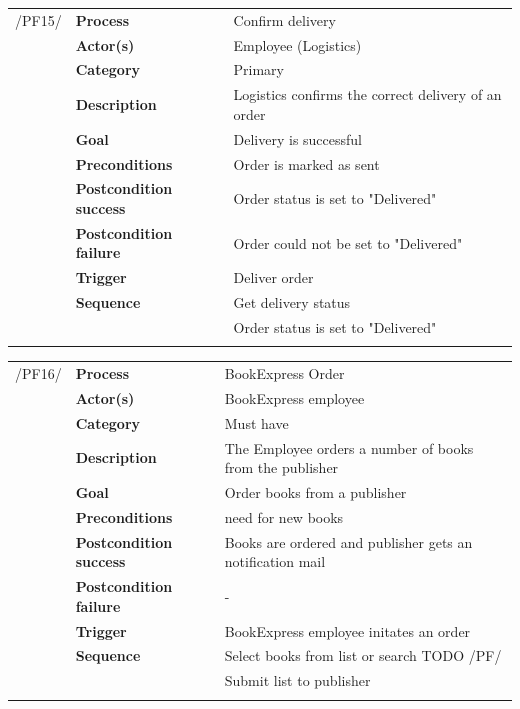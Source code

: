 \documentclass[11pt,a4paper,oneside,svgnames]{report}
\begin{document}
\noindent
\begin{tabular}{p{1.5cm}p{3cm}p{8cm}}
\cellcolor{white}/PF15/	& \textbf{Process} & Confirm delivery\\
\cellcolor{white}		& \textbf{Actor(s)} & Employee (Logistics)\\
\cellcolor{white}		& \textbf{Category} & Primary\\
\cellcolor{white}		& \textbf{Description}	 & Logistics confirms the correct delivery of an order\\
\cellcolor{white}		& \textbf{Goal} & Delivery is successful\\
\cellcolor{white}		& \textbf{Preconditions} & Order is marked as sent\\
\cellcolor{white}		& \textbf{Postcondition success} & Order status is set to "Delivered"\\
\cellcolor{white}		& \textbf{Postcondition failure} & Order could not be set to "Delivered"\\
\cellcolor{white}		& \textbf{Trigger} & Deliver order\\
\cellcolor{white}		& \textbf{Sequence} & Get delivery status\\
\cellcolor{white}		& & Order status is set to "Delivered"\\
\cellcolor{white}\hfill \\
\end{tabular}

\noindent
\begin{tabular}{p{1.5cm}p{3cm}p{8cm}}
\cellcolor{white}/PF16/	& \textbf{Process} & BookExpress Order\\
\cellcolor{white}		& \textbf{Actor(s)} & BookExpress employee\\
\cellcolor{white}		& \textbf{Category} & Must have\\
\cellcolor{white}		& \textbf{Description}	 & The Employee orders a number of books from the publisher\\
\cellcolor{white}		& \textbf{Goal} & Order books from a publisher\\
\cellcolor{white}		& \textbf{Preconditions} & need for new books\\
\cellcolor{white}		& \textbf{Postcondition success} & Books are ordered and publisher gets an notification mail\\
\cellcolor{white}		& \textbf{Postcondition failure} & -\\
\cellcolor{white}		& \textbf{Trigger} & BookExpress employee initates an order\\
\cellcolor{white}		& \textbf{Sequence} & Select books from list or search TODO /PF/\\
\cellcolor{white}		& & Submit list to publisher\\
\cellcolor{white}\hfill \\
\end{tabular}
\end{document}
